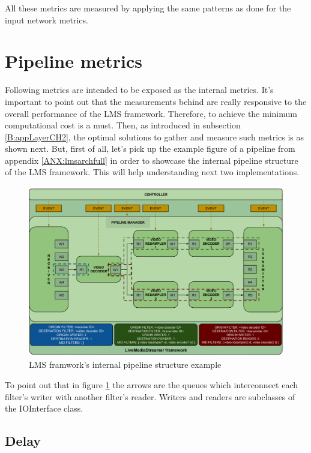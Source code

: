 All these metrics are measured by applying the same patterns as done for the input network metrics.

\section{Pipeline metrics}

Following metrics are intended to be exposed as the internal metrics. It's important to point out that the measurements behind are really responsive to the overall performance of the LMS framework. Therefore, to achieve the minimum computational cost is a must. Then, as introduced in subsection \ref{B:appLayerCH2}, the optimal solutions to gather and measure such metrics is as shown next. But, first of all, let's pick up the example figure of a pipeline from appendix \ref{ANX:lmsarchfull} in order to showcase the internal pipeline structure of the LMS framework. This will help understanding next two implementations.

\begin{figure}[!htb]
\begin{center}
\includegraphics[width=1\textwidth]{./images/LMSpipelineBasicOne.png}
\caption{LMS framwork's internal pipeline structure example}
\label{F:lmsps}
\end{center}
\end{figure}

To point out that in figure \ref{F:lmsps} the arrows are the queues which interconnect each filter's writer with another filter's reader. Writers and readers are subclasses of the IOInterface class.

\subsection{Delay}

